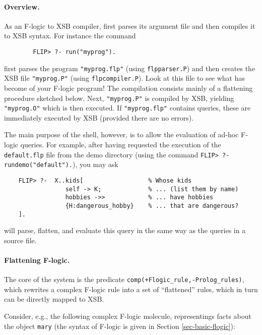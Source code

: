 \paragraph{Overview.}

As an F-logic to XSB compiler, \FLIP first parses its argument file and then
compiles it to XSB syntax. For instance the command
\begin{verbatim}
        FLIP> ?- run("myprog").  
\end{verbatim}
first parses the program \verb|"myprog.flp"| (using \texttt{flpparser.P})
and then creates the XSB file \verb|"myprog.P"| (using
\texttt{flpcompiler.P}).  Look at this file to see what has become of your
F-logic program! The compilation consists mainly of a flattening procedure
sketched below.  Next, \verb|"myprog.P"| is compiled by XSB, yielding
\verb|"myprog.O"| which is then executed.  If \verb|"myprog.flp"| contains
queries, these are immediately executed by XSB (provided there
are no errors).

The main purpose of the \FLIP shell, however, is to allow the
evaluation of ad-hoc F-logic queries. For example, after having
requested the execution of the \texttt{default.flp} file from the demo
directory (using the
command \texttt{FLIP>~?-rundemo("default").}), you may ask
\begin{verbatim}
    FLIP> ?-  X..kids[                  % Whose kids
                 self -> K;             % ... (list them by name)
                 hobbies ->>            % ... have hobbies
                 {H:dangerous_hobby}    % ... that are dangerous?
    ]. 
\end{verbatim}
\FLIP will parse, flatten, and evaluate this query in the same way as
the queries in a source file.





\paragraph{Flattening F-logic.}

The core of the \FLIP system is the predicate
\texttt{comp(+Flogic\_rule,-Prolog\_rules)}, which rewrites a complex
F-logic rule into a set of ``flattened'' rules, which in turn can be
directly mapped to XSB.

Consider, e.g., the following complex F-logic molecule, representings
facts about the object \texttt{mary} (the syntax of F-logic is given in
Section \ref{sec-basic-flogic}):

